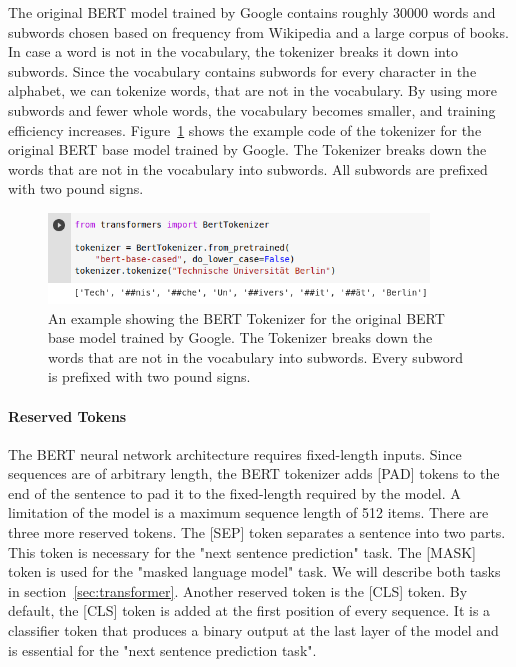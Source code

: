 The original BERT model trained by Google contains roughly 30000 words and subwords chosen based on frequency from Wikipedia and a large corpus of books. In case a word is not in the vocabulary, the tokenizer breaks it down into subwords. Since the vocabulary contains subwords for every character in the alphabet, we can tokenize words, that are not in the vocabulary. By using more subwords and fewer whole words, the vocabulary becomes smaller, and training efficiency increases. Figure~\ref{fig:bert_tokenizer} shows the example code of the tokenizer for the original BERT base model trained by Google. The Tokenizer breaks down the words that are not in the vocabulary into subwords. All subwords are prefixed with two pound signs.

\begin{figure}[htbp]
\centering
\includegraphics[width=0.9\textwidth]{images/illustrations/bert_tokenizer.png}
\caption{An example showing the BERT Tokenizer for the original BERT base model trained by Google. The Tokenizer breaks down the words that are not in the vocabulary into subwords. Every subword is prefixed with two pound signs.}
\label{fig:bert_tokenizer}
\end{figure}

\paragraph{Reserved Tokens}
The BERT neural network architecture requires fixed-length inputs. Since sequences are of arbitrary length, the BERT tokenizer adds [PAD] tokens to the end of the sentence to pad it to the fixed-length required by the model. A limitation of the model is a maximum sequence length of 512 items. There are three more reserved tokens. The [SEP] token separates a sentence into two parts. This token is necessary for the "next sentence prediction" task. The [MASK] token is used for the "masked language model" task. We will describe both tasks in section~\ref{sec:transformer}.
Another reserved token is the [CLS] token. By default, the [CLS] token is added at the first position of every sequence. It is a classifier token that produces a binary output at the last layer of the model and is essential for the "next sentence prediction task".

